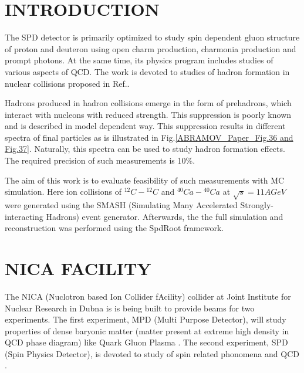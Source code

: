 \documentclass[12pt, twocolumn]{article}
\begin{document}
\section{INTRODUCTION}
The SPD detector is primarily optimized to study spin dependent
gluon structure of proton and deuteron using open charm production,
charmonia production and prompt photons. At the same time, 
its physics program includes studies of various aspects of QCD.
The work is devoted to studies of hadron formation in nuclear
collisions proposed in Ref.\cite{abramov2021possible}.

Hadrons produced in hadron collisions emerge in the form of prehadrons,
which interact with nucleons with reduced strength. This suppression is
poorly known and is described in model dependent way. This suppression
results in different spectra of final particles as is illustrated in
Fig.\ref{ABRAMOV_Paper_Fig.36 and Fig.37}. Naturally, this spectra
can be used  to study hadron formation effects. The required precision
of such measurements is 10\%.

The aim of this work is to evaluate  feasibility of such measurements
with MC simulation. Here ion collisions of $^{12}C-{^{12}C}$ and $^{40}Ca-{^{40}Ca}$ at $\sqrt{s}=11 AGeV$ were generated using the SMASH (Simulating Many Accelerated Strongly-interacting Hadrons) event generator. Afterwards, the the full simulation and reconstruction was performed using the SpdRoot framework.



\section{NICA FACILITY}
The NICA (Nuclotron based Ion Collider fAcility) collider at Joint Institute for Nuclear Research in Dubna is is being built to  provide beams for two experiments. The first experiment, MPD (Multi Purpose Detector), will study properties of dense baryonic matter (matter present at extreme high density in QCD phase diagram) like Quark Gluon Plasma \cite{kekelidze2017feasibility}. The second experiment, SPD (Spin Physics Detector), is devoted to study of spin related phonomena and QCD \cite{guskov2021spin}.
\end{document}
